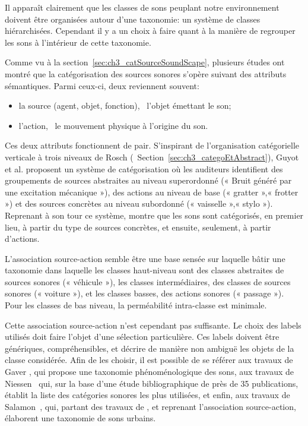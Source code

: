 Il apparaît clairement que les classes de sons peuplant notre environnement doivent être organisées autour d'une taxonomie: un système de classes hiérarchisées. Cependant il y a un choix à faire quant à la manière de regrouper les sons à l'intérieur de cette taxonomie.

Comme vu à la section~\ref{sec:ch3_catSourceSoundScape}, plusieurs études ont montré que la catégorisation des sources sonores s'opère suivant des attributs sémantiques. Parmi ceux-ci, deux reviennent souvent:

\begin{itemize}
\item la source (agent, objet, fonction), \ie~l'objet émettant le son;
\item l'action, \ie~le mouvement physique à l'origine du son.
\end{itemize} 

Ces deux attributs fonctionnent de pair. S'inspirant de l'organisation catégorielle verticale à trois niveaux de Rosch (\cf~Section~\ref{sec:ch3_categoEtAbstract}), Guyot et al. \citep{guyot1997} proposent un système de catégorisation où les auditeurs identifient des groupements de sources abstraites au niveau superordonné (« Bruit généré par une excitation mécanique »), des actions au niveau de base (« gratter »,« frotter ») et des sources concrètes au niveau subordonné (« vaisselle »,« stylo »). Reprenant à son tour ce système, \citep{houix_lexical_2012} montre que les sons sont catégorisés, en premier lieu, à partir du type de sources concrètes, et ensuite, seulement, à partir d'actions.

L'association source-action semble être une base sensée sur laquelle bâtir une taxonomie dans laquelle les classes haut-niveau sont des classes abstraites de sources sonores (« véhicule »), les classes intermédiaires, des classes de sources sonores (« voiture »), et les classes basses, des actions sonores (« passage »). Pour les classes de bas niveau, la perméabilité intra-classe est minimale.

Cette association source-action n'est cependant pas suffisante. Le choix des labels utilisés doit faire l'objet d'une sélection particulière. Ces labels doivent être génériques, compréhensibles, et décrire de manière non ambiguë les objets de la classe considérée. Afin de les choisir, il est possible de se référer aux travaux de Gaver \citep{gaver1993world}, qui propose une taxonomie phénoménologique des sons, aux travaux de Niessen~\al \citep{niessen2010categories} qui, sur la base d'une étude bibliographique de près de 35 publications, établit la liste des catégories sonores les plus utilisées, et enfin, aux travaux de Salamon~\al \citep{Salamon14}, qui, partant des travaux de \citep{brown2011towards}, et reprenant l'association source-action, élaborent une taxonomie de sons urbains.

